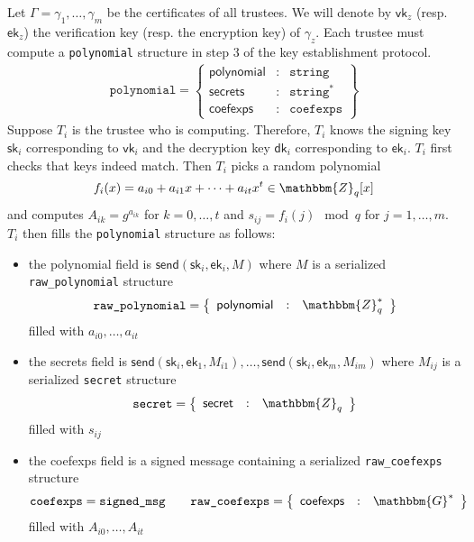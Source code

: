 \documentclass[a4paper]{article}
\newcommand{\G}{\mathbbm{G}}
\newcommand{\Z}{\mathbbm{Z}}
\newcommand{\jstring}{\texttt{string}}
\begin{document}
Let $\Gamma=\gamma_1,\dotsc,\gamma_m$ be the certificates of all
trustees. We will denote by $\textsf{vk}_z$ (resp. $\textsf{ek}_z$)
the \textsf{verification} key (resp. the \textsf{encryption} key) of
$\gamma_z$. Each trustee must compute a \texttt{polynomial} structure
in step 3 of the key establishment protocol.
\begin{gather*}
  \texttt{polynomial}=\left\{
    \begin{array}{rcl}
      \textsf{polynomial}&:&\jstring\\
      \textsf{secrets}&:&\jstring^\ast\\
      \textsf{coefexps}&:&\texttt{coefexps}
    \end{array}
  \right\}
\end{gather*}
Suppose $T_i$ is the trustee who is computing. Therefore, $T_i$ knows
the signing key $\textsf{sk}_i$ corresponding to $\textsf{vk}_i$ and the
decryption key $\textsf{dk}_i$ corresponding to $\textsf{ek}_i$. $T_i$
first checks that keys indeed match. Then $T_i$ picks a random
polynomial
\[
  f_i(x)=a_{i0}+a_{i1}x+\dotsb+a_{it}x^t\in\Z_q[x]
\]
and computes $A_{ik}=g^{a_{ik}}$ for $k=0,\dotsc,t$ and
$s_{ij}=f_i(j)\mod q$ for $j=1,\dotsc,m$. $T_i$ then fills the
\texttt{polynomial} structure as follows:
\begin{itemize}
\item the \textsf{polynomial} field is
  $\textsf{send}(\textsf{sk}_i,\textsf{ek}_i,M)$ where $M$ is a
  serialized \texttt{raw\_polynomial} structure
  \begin{gather*}
    \texttt{raw\_polynomial}=\left\{
      \begin{array}{rcl}
        \textsf{polynomial}&:&\Z_q^\ast
      \end{array}
    \right\}
  \end{gather*}
  filled with $a_{i0},\dotsc,a_{it}$
\item the \textsf{secrets} field is
  $\textsf{send}(\textsf{sk}_i,\textsf{ek}_1,M_{i1}),\dotsc,\textsf{send}(\textsf{sk}_i,\textsf{ek}_m,M_{im})$
  where $M_{ij}$ is a serialized \texttt{secret} structure
  \begin{gather*}
    \texttt{secret}=\left\{
      \begin{array}{rcl}
        \textsf{secret}&:&\Z_q
      \end{array}
    \right\}
  \end{gather*}
  filled with $s_{ij}$
\item the \textsf{coefexps} field is a signed message containing a
  serialized \texttt{raw\_coefexps} structure
  \begin{gather*}
    \texttt{coefexps}=\texttt{signed\_msg}
    \qquad
    \texttt{raw\_coefexps}=\left\{
      \begin{array}{rcl}
        \textsf{coefexps}&:&\G^\ast
      \end{array}
    \right\}
  \end{gather*}
  filled with $A_{i0},\dotsc,A_{it}$
\end{itemize}
\end{document}
